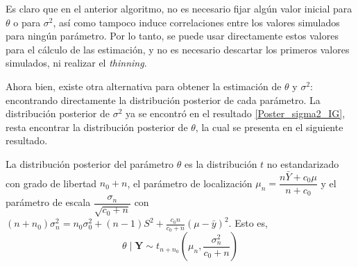 Es claro que en el anterior algoritmo, no es necesario fijar algún valor inicial para $\theta$ o para $\sigma^2$, así como tampoco induce correlaciones entre los valores simulados para ningún parámetro. Por lo tanto, se puede usar directamente estos valores para el cálculo de las estimación, y no es necesario descartar los primeros valores simulados, ni realizar el \emph{thinning}.

Ahora bien, existe otra alternativa para obtener la estimación de $\theta$ y $\sigma^2$: encontrando directamente la distribución posterior de cada parámetro. La distribución posterior de $\sigma^2$ ya se encontró en el resultado \ref{Poster_sigma2_IG}, resta encontrar la distribución posterior de $\theta$, la cual se presenta en el siguiente resultado. 

\begin{Res}\label{Pos_theta_t_noestandar}
La distribución posterior del parámetro $\theta$ es la distribución $t$ no estandarizado con grado de libertad $n_0+n$, el parámetro de localización $\mu_n=\dfrac{n\bar{Y}+c_0\mu}{n+c_0}$ y el parámetro de escala $\dfrac{\sigma_n}{\sqrt{c_0+n}}$ con $(n+n_0)\sigma^2_n=n_0\sigma^2_0+(n-1)S^2+\frac{c_0n}{c_0+n}(\mu-\bar{y})^2$. Esto es, 
\begin{equation*}
\theta \mid \mathbf{Y} \sim t_{n+n_0}\left(\mu_n, \frac{\sigma^2_n}{c_0+n}\right)
\end{equation*}
\end{Res}

